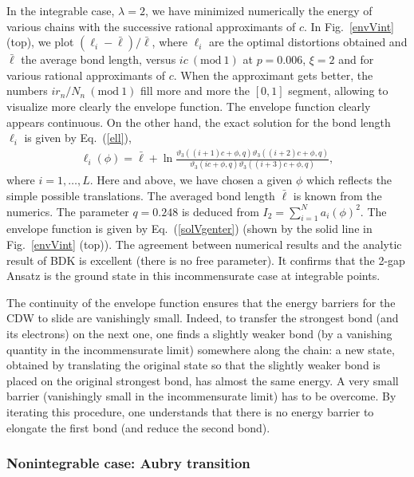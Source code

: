 \documentclass[]{revtex4-1}
\begin{document}
In the integrable case, $\lambda=2$,  we have minimized numerically the energy of various chains with the successive rational approximants of $c$. In Fig.~\ref{envVint} (top), we plot $(\ell_i-\bar{\ell})/\bar{\ell}$, where $\ell_i$ are the optimal distortions obtained and $\bar{\ell}$ the average bond length, versus 
 $ic~(\mbox{mod}~1)$ at $p=0.006$, $\xi=2$ and for various rational approximants of $c$. When the approximant gets better, the numbers $ir_n/N_n~(\mbox{mod}~1)$ fill more and more the $[0,1]$ segment, allowing to visualize more clearly the envelope function. The envelope function clearly appears continuous.
 On the other hand, the exact solution for the bond length $\ell_i$ is given by Eq.~(\ref{ell}),
\begin{eqnarray}
  \ell_{i}(\phi) = \bar{\ell} + \ln  \frac{\vartheta_3((i+1)c+\phi,q)\vartheta_3((i+2)c+\phi,q) }{\vartheta_3(ic+\phi,q) \vartheta_3((i+3)c+\phi,q)},
  \label{solVgenter} \end{eqnarray}
where $i=1,\dots,L$. 
Here and above, we have chosen a given $\phi$ which reflects the simple possible translations. The averaged bond length $\bar{\ell}$ is known from the numerics. The parameter $q=0.248$ is deduced from $I_2=\sum_{i=1}^N a_i(\phi)^2$.  The envelope function is given by Eq.~(\ref{solVgenter}) (shown by the solid line in Fig.~\ref{envVint} (top)). The agreement between numerical results and the analytic result of BDK is excellent  (there is no free parameter). It confirms that the 2-gap Ansatz is the ground state in this incommensurate case at integrable points.

The continuity of the envelope function ensures that the energy barriers for the CDW to slide are vanishingly small. Indeed, to transfer the strongest bond (and its electrons) on the next one, one finds a slightly weaker bond (by a vanishing quantity in the incommensurate limit) somewhere along the chain: a new state, obtained by translating the original state so that the slightly weaker bond is placed on the original strongest bond, has almost the same energy. A very small barrier (vanishingly small in the incommensurate limit) has to be overcome. By iterating this procedure, one understands that there is no energy barrier to elongate the first bond (and reduce the second bond).



\subsubsection{Nonintegrable case: Aubry transition}
\end{document}
